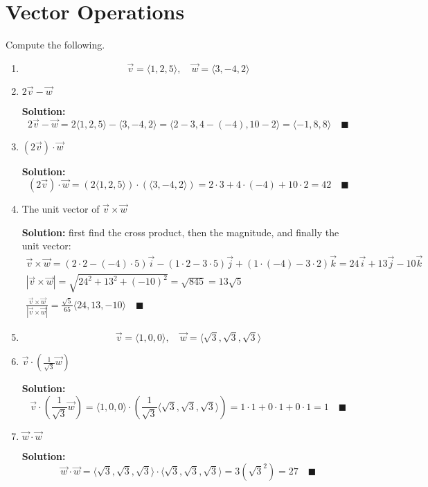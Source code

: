 \documentclass[letterpaper, 10pt]{article}
\begin{document}
\section{Vector Operations}
Compute the following.
\begin{enumerate}[label=(\alph*)]
\item[] \[ \vec v = \langle 1,2,5 \rangle, \quad \vec w = \langle 3, -4, 2 \rangle \]

\item $2 \vec v  - \vec w$
\par \textbf{Solution:}
\[ 2 \vec v  - \vec w = 2 \langle 1,2,5 \rangle - \langle 3, -4, 2 \rangle = \langle 2 - 3,4 - (-4),10 - 2 \rangle = \langle -1,8,8 \rangle \quad\blacksquare \]

\item $(2\vec v) \cdot \vec w$
\par \textbf{Solution:}
\[ (2 \vec v)  \cdot \vec w = (2 \langle 1,2,5 \rangle) \cdot( \langle 3, -4, 2 \rangle) = 2 \cdot 3 + 4 \cdot (-4) + 10 \cdot 2 = 42 \quad\blacksquare \]

\item The unit vector of $\vec v \times \vec w$
\par \textbf{Solution:} first find the cross product, then the magnitude, and finally the unit vector:
\begin{gather*}
\vec v \times \vec w = (2 \cdot 2 - (-4)\cdot 5) \vec i - (1 \cdot 2 - 3 \cdot 5) \vec j + (1 \cdot (-4) - 3 \cdot 2) \vec k  = 24 \vec i + 13 \vec j - 10 \vec k \\
|\vec v \times \vec w| = \sqrt{24^2 + 13^2 + (-10)^2} = \sqrt{845} = 13\sqrt{5} \\
\frac{\vec v \times \vec w}{|\vec v \times \vec w|} = \frac{\sqrt{5}}{65} \langle 24,13,-10 \rangle\quad \blacksquare
\end{gather*}


\item[] \[ \vec v = \langle 1,0,0 \rangle, \quad \vec w = \langle \sqrt{3}, \sqrt{3},\sqrt{3} \rangle \]

\item $\vec v \cdot \left( \frac{1}{\sqrt{3}} \vec w \right)$
\par \textbf{Solution:}
\[\vec v \cdot \left( \frac{1}{\sqrt{3}} \vec w \right) = \langle 1,0,0 \rangle \cdot \left( \frac{1}{\sqrt{3}} \langle \sqrt{3}, \sqrt{3},\sqrt{3} \rangle \right) = 1 \cdot 1 + 0 \cdot 1 + 0 \cdot 1 = 1 \quad\blacksquare \]


\item $\vec w \cdot \vec w$
\par \textbf{Solution:}
\[ \vec w \cdot \vec w = \langle \sqrt{3}, \sqrt{3},\sqrt{3} \rangle \cdot \langle \sqrt{3}, \sqrt{3},\sqrt{3} \rangle = 3(\sqrt{3}^2) = 27 \quad\blacksquare \]


\end{enumerate}
\end{document}
